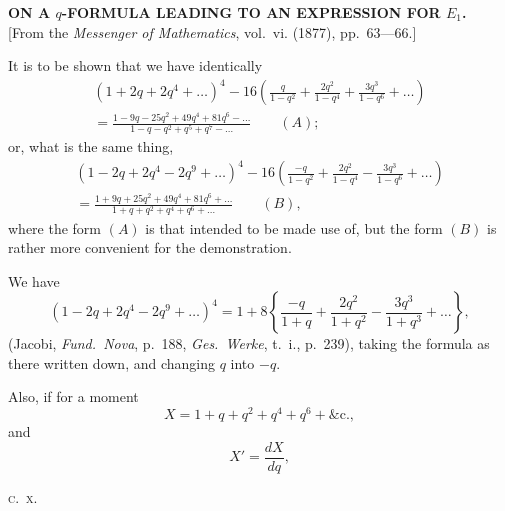 \documentclass[12pt,a4paper]{article}
\begin{document}
\begin{center}
\textbf{ON A $q$-FORMULA LEADING TO AN EXPRESSION FOR $E_1$.}\\[1em]
[From the \textit{Messenger of Mathematics}, vol.~vi. (1877), pp.~63---66.]
\end{center}

It is to be shown that we have identically
\begin{multline*}
(1 + 2 q + 2 q^4 + \ldots)^4 - 16 \left(\frac{q}{1 - q^2} + \frac{2 q^2}{1 - q^4} + \frac{3 q^3}{1 - q^6} + \ldots\right) \\
= \frac{1 - 9 q - 25 q^2 + 49 q^4 + 81 q^6 - \ldots}{1 - q - q^2 + q^5 + q^7 - \ldots} \qquad (A);
\end{multline*}
or, what is the same thing,
\begin{multline*}
(1 - 2 q + 2 q^4 - 2 q^9 + \ldots)^4 - 16 \left(\frac{-q}{1 - q^2} + \frac{2 q^2}{1 - q^4} - \frac{3 q^3}{1 - q^6} + \ldots\right) \\
= \frac{1 + 9 q + 25 q^2 + 49 q^4 + 81 q^6 + \ldots}{1 + q + q^2 + q^4 + q^6 + \ldots} \qquad (B),
\end{multline*}
where the form $(A)$ is that intended to be made use of, but the form $(B)$ is rather more convenient for the demonstration.

We have
\[
(1 - 2 q + 2 q^4 - 2 q^9 + \ldots)^4 = 1 + 8 \left\{\frac{-q}{1 + q} + \frac{2 q^2}{1 + q^2} - \frac{3 q^3}{1 + q^3} + \ldots\right\},
\]
(Jacobi, \textit{Fund.~Nova}, p.~188, \textit{Ges.~Werke}, t.~i., p.~239), taking the formula as there written down, and changing $q$ into $-q$.

Also, if for a moment
\[
X = 1 + q + q^2 + q^4 + q^6 + \&\text{c.},
\]
and
\[
X' = \frac{d X}{d q},
\]

\hfill\textsc{c.~x.}
\end{document}
